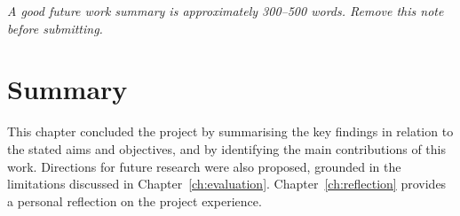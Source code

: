 \noindent\textit{A good future work summary is approximately 300--500 words. 
Remove this note before submitting.}

\section{Summary}
\label{sec:con_summary}

This chapter concluded the project by summarising the key findings in relation 
to the stated aims and objectives, and by identifying the main contributions 
of this work. Directions for future research were also proposed, grounded in 
the limitations discussed in Chapter~\ref{ch:evaluation}. 
Chapter~\ref{ch:reflection} provides a personal reflection on the project 
experience.